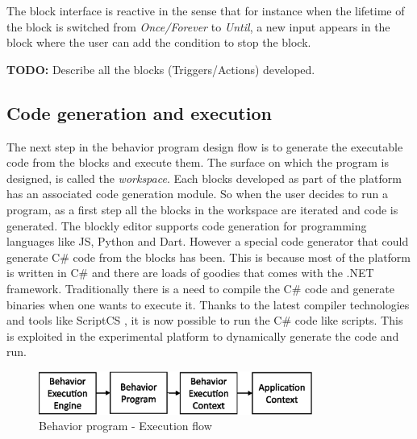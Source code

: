 The block interface is reactive in the sense that for instance when the lifetime of the block is switched from \emph{Once/Forever} to \emph{Until}, a new input appears in the block where the user can add the condition to stop the block.

\textbf{TODO: } Describe all the blocks (Triggers/Actions) developed.

\subsection{Code generation and execution}
The next step in the behavior program design flow is to generate the executable code from the blocks and execute them. The surface on which the program is designed, is called the \emph{workspace}. Each blocks developed as part of the platform has an associated code generation module. So when the user decides to run a program, as a first step all the blocks in the workspace are iterated and code is generated. The blockly editor supports code generation for programming languages like JS, Python and Dart. However a special code generator that could generate C\# code from the blocks has been. This is because most of the platform is written in C\# and there are loads of goodies that comes with the .NET framework. Traditionally there is a need to compile the C\# code and generate binaries when one wants to execute it. Thanks to the latest compiler technologies and tools like ScriptCS \cite{ScriptCS}, it is now possible to run the C\# code like scripts. This is exploited in the experimental platform to dynamically generate the code and run.
\begin{figure}[H]
\centering
\includegraphics[width=0.8\textwidth]{../thesis/assets/execution_flow.eps}
\caption[Behavior program - Execution flow]{Behavior program - Execution flow}
\label{fig:program_execution}
\end{figure}

